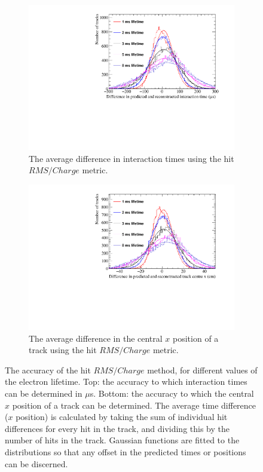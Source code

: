 \begin{figure}
  \centering
  \begin{subfigure}{0.6\textwidth}
    \centering
    \includegraphics[width=\textwidth]{Canvas_AvDiff_T_RMS_Q_ElecLifetime}
    \caption{The average difference in interaction times using the hit $RMS/Charge$ metric.}
    \label{fig:DiffLifeStudy_AvDiff_RMS_Int_T}
  \end{subfigure}
  \begin{subfigure}{0.6\textwidth}
    \centering
    \includegraphics[width=\textwidth]{Canvas_AvDiff_X_RMS_Q_ElecLifetime}
    \caption{The average difference in the central $x$ position of a track using the hit $RMS/Charge$ metric.}
    \label{fig:DiffLifeStudy_AvDiff_RMS_Int_X}
  \end{subfigure}
  \caption[Comparing the accuracy of the hit $RMS$ method, as the electron lifetime changes]
          {The accuracy of the hit $RMS/Charge$ method, for different values of the electron lifetime. Top: the accuracy to which interaction times can be determined in $\mu$s. Bottom: the accuracy to which the central $x$ position of a track can be determined. The average time difference ($x$ position) is calculated by taking the sum of individual hit differences for every hit in the track, and dividing this by the number of hits in the track. Gaussian functions are fitted to the distributions so that any offset in the predicted times or positions can be discerned.}
  \label{fig:DiffLifeStudy_AvDiff_RMS_Int}
\end{figure}

